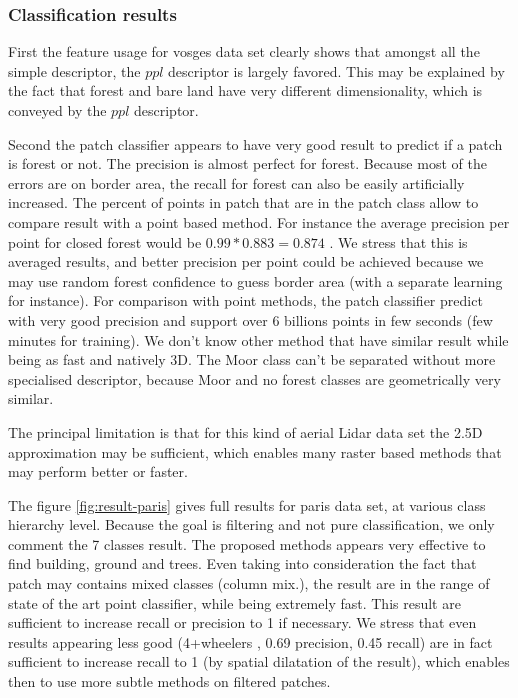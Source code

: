 	\subsubsection{Classification results}
		  First the feature usage for vosges data set clearly shows that amongst all the simple descriptor, the $ppl$ descriptor is largely favored.
		  This may be explained by the fact that forest and bare land have very different dimensionality, which is conveyed by the $ppl$ descriptor.
		  
		  Second the patch classifier appears to have very good result to predict if a patch is forest or not. The precision is almost perfect for forest.
		  Because most of the errors are on border area, the recall for forest can also be easily artificially increased. The percent of points in patch that are in the patch class allow to compare result with a point based method. 
		  For instance the average precision per point for closed forest would be $0.99*0.883=0.874$ . We stress that this is averaged results, and better precision per point could be achieved because we may use random forest confidence to guess border area (with a separate learning for instance).
		  For comparison with point methods, the patch classifier predict with very good precision and support over 6 billions points in few seconds (few minutes for training). We don't know other method that have similar result while being as fast and natively 3D.
		   The Moor class can't be separated without more specialised descriptor, because Moor and no forest classes are geometrically very similar.
		  
		  The principal limitation is that for this kind of aerial Lidar data set the 2.5D approximation may be sufficient, which enables many raster based methods that may perform better or faster.
		  
		  The figure \ref{fig:result-paris} gives full results for paris data set, at various class hierarchy level.
		  Because the goal is filtering and not pure classification, we only comment the 7 classes result. The proposed methods appears very effective to find building, ground and trees.
		  Even taking into consideration the fact that patch may contains mixed classes (column mix.), the result are in the range of state of the art point classifier, while being extremely fast. 
		  This result are sufficient to increase recall or precision to 1 if necessary.
		  We stress that even results appearing less good (4+wheelers , 0.69 precision, 0.45 recall) are in fact sufficient to increase recall to 1 (by spatial dilatation of the result), which enables then to use more subtle methods on filtered patches.
		  
